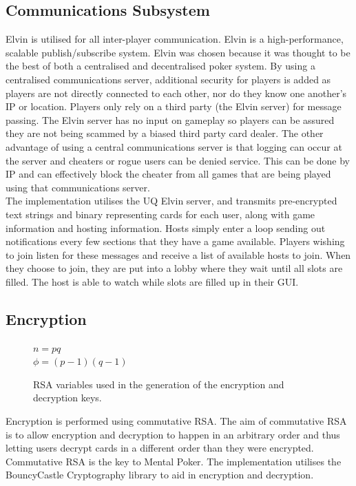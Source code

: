 \documentclass[11pt, oneside]{article}   	%
\begin{document}
\subsection{Communications Subsystem}
\label{sec:comsubsys}				

Elvin is utilised for all inter-player communication. Elvin is a high-performance, scalable publish/subscribe system. Elvin was chosen because it was thought to be the best of both a centralised and decentralised poker system. By using a centralised communications server, additional security for players is added as players are not directly connected to each other, nor do they know one another's IP or location. Players only rely on a third party (the Elvin server) for message passing. The Elvin server has no input on gameplay so players can be assured they are not being scammed by a biased third party card dealer. The other advantage of using a central communications server is that logging can occur at the server and cheaters or rogue users can be denied service. This can be done by IP and can effectively block the cheater from all games that are being played using that communications server.\\

The implementation utilises the UQ Elvin server, and transmits pre-encrypted text strings and binary representing cards for each user, along with game information and hosting information. Hosts simply enter a loop sending out notifications every few sections that they have a game available. Players wishing to join listen for these messages and receive a list of available hosts to join. When they choose to join, they are put into a lobby where they wait until all slots are filled. The host is able to watch while slots are filled up in their GUI.

\subsection{Encryption}
\label{sec:encryption}

\begin{figure}[H]
	\caption{RSA variables used in the generation of the encryption and decryption keys.}
	\vspace{0.25cm} 
  	\centering
	$n=pq$\\$\phi=(p-1)(q-1)$
	\vspace{0.25cm} 
	\label{fig:rsavars}
\end{figure}

Encryption is performed using commutative RSA. The aim of commutative RSA is to allow encryption and decryption to happen in an arbitrary order and thus letting users decrypt cards in a different order than they were encrypted. Commutative RSA is the key to Mental Poker. The implementation utilises the BouncyCastle Cryptography library to aid in encryption and decryption.\\
\end{document}
